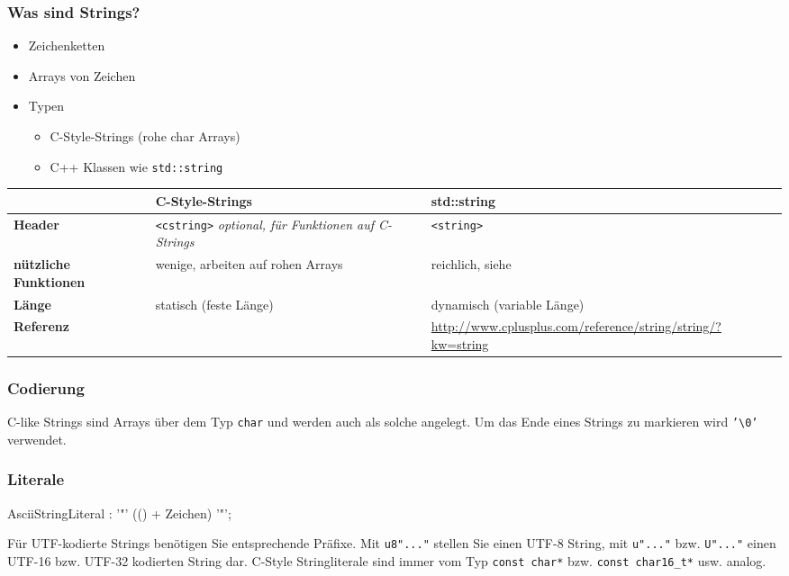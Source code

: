 \documentclass[a4paper]{report}
\begin{document}
\subsubsection{Was sind Strings?}
\begin{itemize}
	\item Zeichenketten
	\item Arrays von Zeichen
	\item Typen
	\begin{itemize}
		\item C-Style-Strings (rohe char Arrays)
		\item C++ Klassen wie \texttt{std::string}
	\end{itemize}
\end{itemize}

\begin{center}
	\begin{tabular}{|M{3cm}|M{6cm}|M{6cm}|} \hline
		&\textbf{C-Style-Strings} & \textbf{std::string} \\ \hline
		\textbf{Header} & \texttt{<cstring>} \textit{optional, für Funktionen auf C-Strings} & \texttt{<string>} \\ \hline
		\textbf{nützliche Funktionen} & wenige, arbeiten auf rohen Arrays & reichlich, siehe \\ \hline
		\textbf{Länge} & statisch (feste Länge) & dynamisch (variable Länge)\\ \hline
		\textbf{Referenz} & & \url{http://www.cplusplus.com/reference/string/string/?kw=string} \\ \hline
	\end{tabular}
\end{center}

\subsubsection{Codierung}
C-like Strings sind Arrays über dem Typ \texttt{char} und werden auch als solche angelegt. Um das Ende eines Strings zu markieren wird \texttt{'\textbackslash 0'} verwendet.

\subsubsection{Literale}

\begin{rail}
	AsciiStringLiteral : '"' (() + Zeichen) '"';
\end{rail}
Für UTF-kodierte Strings benötigen Sie entsprechende Präfixe. Mit \texttt{u8"..."} stellen Sie einen UTF-8 String, mit \texttt{u"..."} bzw. \texttt{U"..."} einen UTF-16 bzw. UTF-32 kodierten String dar. C-Style Stringliterale sind immer vom Typ \texttt{const char*} bzw. \texttt{const char16\_t*} usw. analog. %
\end{document}
